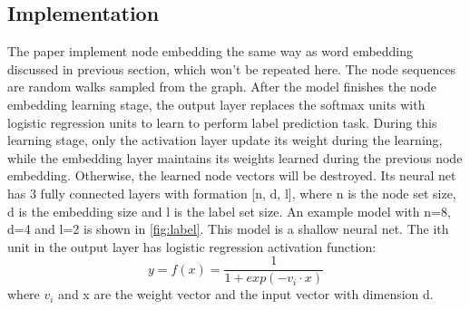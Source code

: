 \documentclass{article}
\begin{document}
\subsection{Implementation}
The paper implement node embedding the same way as word embedding discussed in previous section, which won't be repeated here. The node sequences are random walks sampled from the graph. After the model finishes the node embedding learning stage, the output layer replaces the softmax units with logistic regression units to learn to perform label prediction task. During this learning stage, only the activation layer update its weight during the learning, while the embedding layer maintains its weights learned during the previous node embedding. Otherwise, the learned node vectors will be destroyed. Its neural net has 3 fully connected layers with formation [n, d, l], where n is the node set size, d is the embedding size and l is the label set size. An example model with n=8, d=4 and l=2 is shown in \autoref{fig:label}. This model is a shallow neural net. The ith unit in the output layer has logistic regression activation function:
\begin{equation}
y = f(x) = \frac{1}{1 + exp(-v_i \cdot x)}
\end{equation}
where $ v_i $ and x are the weight vector and the input vector with dimension d.
\end{document}
